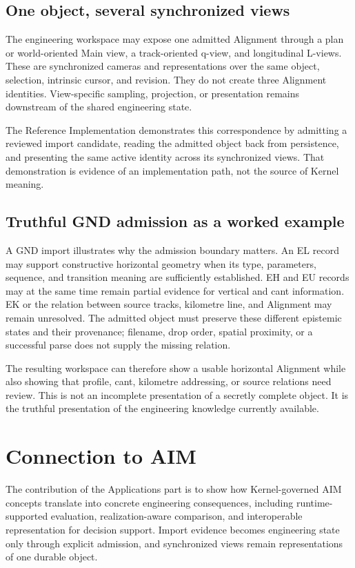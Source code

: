 \subsection{One object, several synchronized views}

The engineering workspace may expose one admitted Alignment through a plan or
world-oriented Main view, a track-oriented q-view, and longitudinal L-views.
These are synchronized cameras and representations over the same object,
selection, intrinsic cursor, and revision. They do not create three Alignment
identities. View-specific sampling, projection, or presentation remains
downstream of the shared engineering state.

The Reference Implementation demonstrates this correspondence by admitting a
reviewed import candidate, reading the admitted object back from persistence,
and presenting the same active identity across its synchronized views. That
demonstration is evidence of an implementation path, not the source of Kernel
meaning.

\subsection{Truthful GND admission as a worked example}

A GND import illustrates why the admission boundary matters. An EL record may
support constructive horizontal geometry when its type, parameters, sequence,
and transition meaning are sufficiently established. EH and EU records may at
the same time remain partial evidence for vertical and cant information. EK or
the relation between source tracks, kilometre line, and Alignment may remain
unresolved. The admitted object must preserve these different epistemic states
and their provenance; filename, drop order, spatial proximity, or a successful
parse does not supply the missing relation.

The resulting workspace can therefore show a usable horizontal Alignment while
also showing that profile, cant, kilometre addressing, or source relations need
review. This is not an incomplete presentation of a secretly complete object.
It is the truthful presentation of the engineering knowledge currently
available.

\section{Connection to AIM}

\begin{summary}
The contribution of the Applications part is to show how Kernel-governed AIM
concepts translate into concrete engineering consequences, including
runtime-supported evaluation, realization-aware comparison, and
interoperable representation for decision support. Import evidence becomes
engineering state only through explicit admission, and synchronized views
remain representations of one durable object.
\end{summary}
